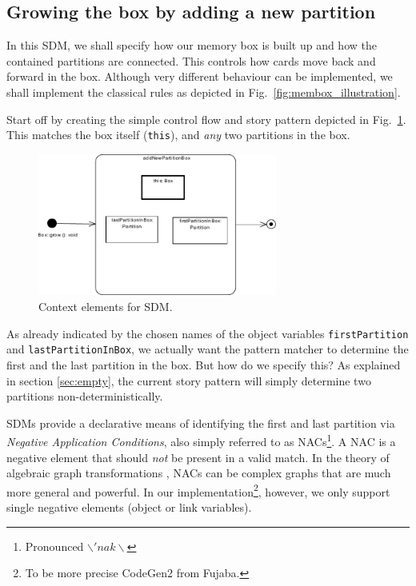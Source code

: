 \subsection{Growing the box by adding a new partition}
\label{sec:sdm_grow}	
	
In this SDM, we shall specify how our memory box is built up and how the
contained partitions are connected.  This controls how cards move back and
forward in the box.  Although very different behaviour can be implemented, we
shall implement the classical rules as depicted in
Fig.~\ref{fig:membox_illustration}.

Start off by creating the simple control flow and story pattern depicted in
Fig.~\ref{fig:sdm_grow_1}.  This matches the box itself (\texttt{this}), and
\emph{any} two partitions in the box.
	
\begin{figure}[htp]
\begin{center}
  \includegraphics[width=0.7\textwidth]{pics/sdmBilder/grow/sdm57}
  \caption{Context elements for SDM.}  
  \label{fig:sdm_grow_1}
\end{center}
\end{figure}

As already indicated by the chosen names of the object variables
\texttt{first\-Partition} and \texttt{last\-Partition\-In\-Box}, we actually
want the pattern matcher to determine the first and the last partition in the box.
But how do we specify this?  As explained in section \ref{sec:empty}, the
current story pattern will simply determine two partitions
non-deterministically.  

SDMs provide a declarative means of identifying the first and last
partition via \emph{Negative Application Conditions}, also simply
referred to as \mbox{NACs}\footnote{Pronounced $\backslash 'nak \backslash$}.
A \mbox{NAC} is a negative element that should \emph{not} be present in a valid
match.  In the theory of algebraic graph transformations \cite{EEPT06},
\mbox{NACs} can be complex graphs that are much more general and powerful.  In
our implementation\footnote{To be more precise CodeGen2 from Fujaba.}, however,
we only support single negative elements (object or link variables).

